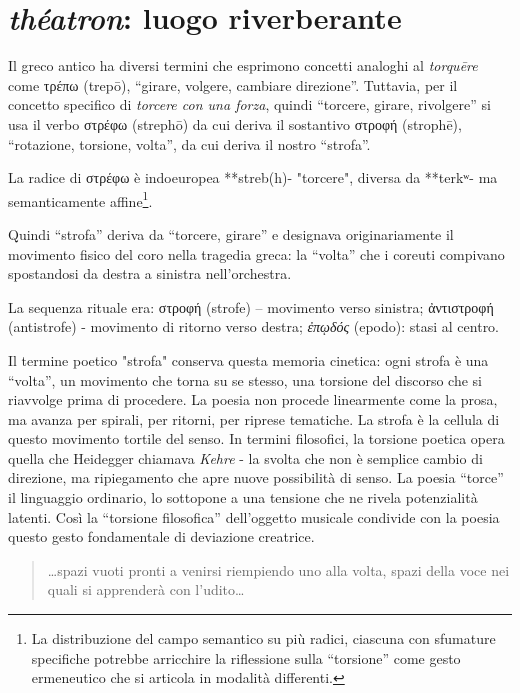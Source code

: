 \section{\emph{théatron}: luogo riverberante}

Il greco antico ha diversi termini che esprimono concetti analoghi al
\textit{torquēre} come \textgreek{τρέπω} (trepō), “girare, volgere, cambiare
direzione”. Tuttavia, per il concetto specifico di \emph{torcere con una forza},
quindi “torcere, girare, rivolgere” si usa il verbo \textgreek{στρέφω}
(strephō) da cui deriva il sostantivo \textgreek{στροφή} (strophē), “rotazione,
torsione, volta”, da cui deriva il nostro “strofa”.

La radice di στρέφω è indoeuropea **streb(h)- "torcere", diversa da **terkʷ- ma
semanticamente affine\footnote{La distribuzione del campo semantico su più radici, ciascuna con sfumature
specifiche potrebbe arricchire la riflessione sulla “torsione” come gesto
ermeneutico che si articola in modalità differenti.}.

Quindi “strofa” deriva da “torcere, girare” e designava originariamente il
movimento fisico del coro nella tragedia greca: la “volta” che i coreuti
compivano spostandosi da destra a sinistra nell'orchestra.

La sequenza rituale era: \textgreek{στροφή} (strofe) – movimento verso sinistra;
\textgreek{ἀντιστροφή} (antistrofe) - movimento di ritorno verso destra;
\emph{ἐπῳδός} (epodo): stasi al centro.

Il termine poetico "strofa" conserva questa memoria cinetica: ogni strofa è una
“volta”, un movimento che torna su se stesso, una torsione del discorso che si
riavvolge prima di procedere. La poesia non procede linearmente come la prosa,
ma avanza per spirali, per ritorni, per riprese tematiche. La strofa è la
cellula di questo movimento tortile del senso. In termini filosofici, la
torsione poetica opera quella che Heidegger chiamava \emph{Kehre} - la svolta
che non è semplice cambio di direzione, ma ripiegamento che apre nuove
possibilità di senso. La poesia “torce” il linguaggio ordinario, lo sottopone a
una tensione che ne rivela potenzialità latenti. Così la “torsione filosofica”
dell'oggetto musicale condivide con la poesia questo gesto fondamentale di
deviazione creatrice.

\begin{quote}
\begin{sf}
\small
\ldots spazi vuoti pronti a venirsi riempiendo uno alla volta, spazi della voce
nei quali si apprenderà con l'udito\ldots~\cite{zambrano1991}
\end{sf}
\end{quote}

